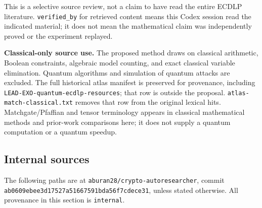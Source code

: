 \documentclass[
  10pt,
]{article}
\begin{document}
This is a selective source review, not a claim to have read the entire
ECDLP literature. \texttt{verified\_by} for retrieved content means this
Codex session read the indicated material; it does not mean the
mathematical claim was independently proved or the experiment replayed.

\textbf{Classical-only source use.} The proposed method draws on
classical arithmetic, Boolean constraints, algebraic model counting, and
exact classical variable elimination. Quantum algorithms and simulation
of quantum attacks are excluded. The full historical atlas manifest is
preserved for provenance, including
\texttt{LEAD-EXO-quantum-ecdlp-resources}; that row is outside the
proposal. \texttt{atlas-match-classical.txt} removes that row from the
original lexical hits. Matchgate/Pfaffian and tensor terminology appears
in classical mathematical methods and prior-work comparisons here; it
does not supply a quantum computation or a quantum speedup.

\subsection{Internal sources}\label{internal-sources}

The following paths are at \texttt{aburan28/crypto-autoresearcher},
commit \texttt{ab0609ebee3d17527a51667591bda56f7cdece31}, unless stated
otherwise. All provenance in this section is \texttt{internal}.
\end{document}
